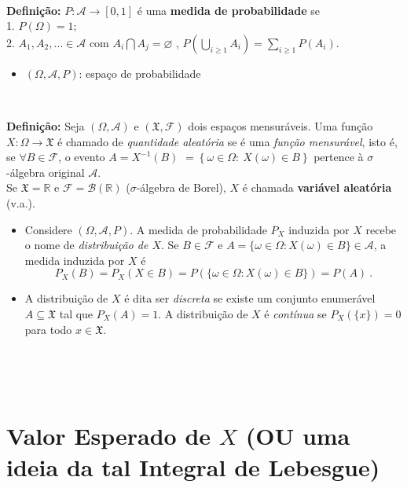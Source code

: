\documentclass[
]{book}
\providecommand{\tightlist}{%
  \setlength{\itemsep}{0pt}\setlength{\parskip}{0pt}}
\begin{document}
\(~\)

\textbf{Definição:} \(P: \mathcal{A} \longrightarrow [0,1]\) é uma \textbf{medida de probabilidade} se\\
1. \(P(\Omega) = 1\);\\
2. \(\displaystyle A_1, A_2, \ldots \in \mathcal{A}\) com \(A_i \bigcap A_j = \varnothing\) , \(\displaystyle P\left(\bigcup_{i \geq 1} A_i\right) = \sum_{i \geq 1} P\left(A_i\right)\).

\begin{itemize}
\tightlist
\item
  \((\Omega, \mathcal{A}, P)\): espaço de probabilidade
\end{itemize}

\(~\)

\textbf{Definição:} Seja \((\Omega,\mathcal{A})\) e \((\mathfrak{X},\mathcal{F})\) dois espaços mensuráveis. Uma função \(X: \Omega \longrightarrow \mathfrak{X}\) é chamado de \emph{quantidade aleatória} se é uma \emph{função mensurável}, isto é, se \(\forall B \in \mathcal{F}\), o evento \(A = X^{-1}(B)\) \(= \left\{\omega \in \Omega:~X(\omega)\in B\right\}\) pertence à \(\sigma\)-álgebra original \(\mathcal{A}\).\\
Se \(\mathfrak{X} = \mathbb{R}\) e \(\mathcal{F}=\mathcal{B}(\mathbb{R})\) (\(\sigma\)-álgebra de Borel), \(X\) é chamada \textbf{variável aleatória} (v.a.).

\begin{itemize}
\item
  Considere \((\Omega,\mathcal{A},P)\). A medida de probabilidade \(P_X\) induzida por \(X\) recebe o nome de \emph{distribuição de \(X\)}. Se \(B \in \mathcal{F}\) e \(A = \{\omega \in \Omega : X(\omega) \in B\} \in \mathcal{A}\), a medida induzida por \(X\) é
  \[P_X(B) = P_X\left(X \in B\right) = P\left(\{\omega \in \Omega :  X(\omega) \in B\}\right) = P(A)~.\]
\item
  A distribuição de \(X\) é dita ser \emph{discreta} se existe um conjunto enumerável \(A \subseteq \mathfrak{X}\) tal que \(P_X(A)=1\). A distribuição de \(X\) é \emph{contínua} se \(P_X\left(\{x\}\right)=0\) para todo \(x \in \mathfrak{X}\).
\end{itemize}

\(~\)

\(~\)

\hypertarget{lebesgue}{%
\section{\texorpdfstring{Valor Esperado de \(X\) (OU uma ideia da tal Integral de Lebesgue)}{Valor Esperado de X (OU uma ideia da tal Integral de Lebesgue)}}\label{lebesgue}}
\end{document}
